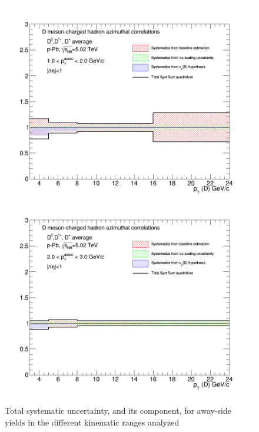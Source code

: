 \begin{figure}[!htbp]
{\includegraphics[width=0.49\linewidth, height=0.33\linewidth]{figures/FitOutput/TotalSystematicSourcesASYield_pthad1dotto2dot.png}}
{\includegraphics[width=0.49\linewidth, height=0.33\linewidth]{figures/FitOutput/TotalSystematicSourcesASYield_pthad2dotto3dot.png}}
\caption{Total systematic uncertainty, and its component, for away-side yields in the different kinematic ranges analyzed}
\label{fig:ASyieldTotalUnc}
\end{figure}

